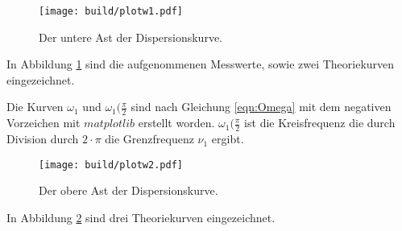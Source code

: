 \begin{figure}
  \centering
  \texttt{[image: build/plotw1.pdf]}
  \caption{Der untere Ast der Dispersionskurve.}
  \label{fig:astw1}
\end{figure}

In Abbildung \ref{fig:astw1} sind die aufgenommenen Messwerte, sowie zwei
Theoriekurven eingezeichnet.

Die Kurven $\omega_1$ und $\omega_1(\frac{\pi}{2}$ sind nach Gleichung
\eqref{eqn:Omega} mit dem negativen
Vorzeichen mit $matplotlib$ \cite{matplotlib} erstellt worden.
$\omega_1(\frac{\pi}{2}$ ist die Kreisfrequenz die durch Division durch
$2\cdot\pi$ die Grenzfrequenz $\nu_1$ ergibt.

\begin{figure}
  \centering
  \texttt{[image: build/plotw2.pdf]}
  \caption{Der obere Ast der Dispersionskurve.}
  \label{fig:astw2}
\end{figure}

In Abbildung \ref{fig:astw2} sind drei Theoriekurven eingezeichnet.
